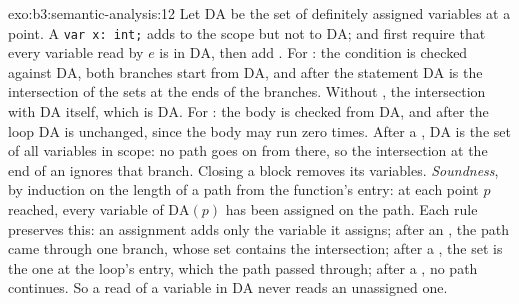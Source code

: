 \begin{solution}{exo:b3:semantic-analysis:12}
Let $\mathrm{DA}$ be the set of definitely assigned variables at a point. A \texttt{var x:\ int;} adds  to the scope but not to $\mathrm{DA}$;  and  first require that every variable read by $e$ is in $\mathrm{DA}$, then add . For : the condition is checked against $\mathrm{DA}$, both branches start from $\mathrm{DA}$, and after the statement $\mathrm{DA}$ is the intersection of the sets at the ends of the branches. Without , the intersection with $\mathrm{DA}$ itself, which is $\mathrm{DA}$. For : the body is checked from $\mathrm{DA}$, and after the loop $\mathrm{DA}$ is unchanged, since the body may run zero times. After a , $\mathrm{DA}$ is the set of all variables in scope: no path goes on from there, so the intersection at the end of an  ignores that branch. Closing a block removes its variables. \emph{Soundness}, by induction on the length of a path from the function's entry: at each point $p$ reached, every variable of $\mathrm{DA}(p)$ has been assigned on the path. Each rule preserves this: an assignment adds only the variable it assigns; after an , the path came through one branch, whose set contains the intersection; after a , the set is the one at the loop's entry, which the path passed through; after a , no path continues. So a read of a variable in $\mathrm{DA}$ never reads an unassigned one.
\end{solution}

